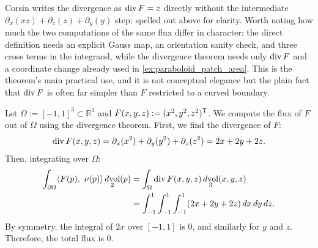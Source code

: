 \begin{ainote}
Corsin writes the divergence as $\operatorname{div} F = z$ directly without the intermediate
$\partial_x(xz)+\partial_z(z)+\partial_y(y)$ step; spelled out above for clarity. Worth
noting how much the two computations of the same flux differ in character: the direct
definition needs an explicit Gauss map, an orientation sanity check, and three cross terms
in the integrand, while the divergence theorem needs only $\operatorname{div} F$ and a coordinate change
already used in \cref{ex:paraboloid_patch_area}. This is the theorem's main
practical use, and it is not conceptual elegance but the plain fact that $\operatorname{div} F$ is often far
simpler than $F$ restricted to a curved boundary.
\end{ainote}

\begin{example}
\label{ex:flux_divergence_cube}
Let $\Omega := [-1,1]^3 \subset \mathbb{R}^3$ and $F(x,y,z) := (x^2, y^2, z^2)^{\mathsf{T}}$.
We compute the flux of $F$ out of $\Omega$ using the divergence theorem.
First, we find the divergence of $F$:
\[\operatorname{div} F(x,y,z) = \partial_x(x^2) + \partial_y(y^2) + \partial_z(z^2) = 2x + 2y + 2z.\]
Then, integrating over $\Omega$:
\begin{align*}
\int_{\partial\Omega} \langle F(p),\ \nu(p)\rangle \mathop{d\text{vol}}_2(p) &= \int_\Omega \operatorname{div} F(x,y,z) \mathop{d\text{vol}}_3(x,y,z) \\
&= \int_{-1}^1 \int_{-1}^1 \int_{-1}^1 (2x + 2y + 2z) \,dx\,dy\,dz.
\end{align*}
By symmetry, the integral of $2x$ over $[-1,1]$ is $0$, and similarly for $y$ and $z$. Therefore, the total flux is $0$.
\end{example}

